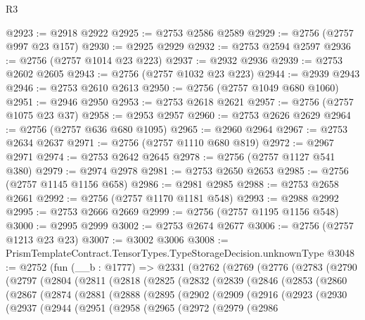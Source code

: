 \begin{lexlean}{R3}
\begin{coremodule}
@2923 := @2918 @2922
@2925 := @2753 @2586 @2589
@2929 := @2756 (@2757 @997 @23 @157)
@2930 := @2925 @2929
@2932 := @2753 @2594 @2597
@2936 := @2756 (@2757 @1014 @23 @223)
@2937 := @2932 @2936
@2939 := @2753 @2602 @2605
@2943 := @2756 (@2757 @1032 @23 @223)
@2944 := @2939 @2943
@2946 := @2753 @2610 @2613
@2950 := @2756 (@2757 @1049 @680 @1060)
@2951 := @2946 @2950
@2953 := @2753 @2618 @2621
@2957 := @2756 (@2757 @1075 @23 @37)
@2958 := @2953 @2957
@2960 := @2753 @2626 @2629
@2964 := @2756 (@2757 @636 @680 @1095)
@2965 := @2960 @2964
@2967 := @2753 @2634 @2637
@2971 := @2756 (@2757 @1110 @680 @819)
@2972 := @2967 @2971
@2974 := @2753 @2642 @2645
@2978 := @2756 (@2757 @1127 @541 @380)
@2979 := @2974 @2978
@2981 := @2753 @2650 @2653
@2985 := @2756 (@2757 @1145 @1156 @658)
@2986 := @2981 @2985
@2988 := @2753 @2658 @2661
@2992 := @2756 (@2757 @1170 @1181 @548)
@2993 := @2988 @2992
@2995 := @2753 @2666 @2669
@2999 := @2756 (@2757 @1195 @1156 @548)
@3000 := @2995 @2999
@3002 := @2753 @2674 @2677
@3006 := @2756 (@2757 @1213 @23 @23)
@3007 := @3002 @3006
@3008 := PrismTemplateContract.TensorTypes.TypeStorageDecision.unknownType
@3048 := @2752
    (fun (__b : @1777) =>
    @2331
      (@2762
        (@2769
          (@2776
            (@2783
              (@2790
                (@2797
                  (@2804
                    (@2811
                      (@2818
                        (@2825
                          (@2832
                            (@2839
                              (@2846
                                (@2853
                                  (@2860
                                    (@2867
                                      (@2874
                                        (@2881
                                          (@2888
                                            (@2895
                                              (@2902
                                                (@2909
                                                  (@2916
                                                    (@2923
                                                      (@2930
                                                        (@2937
                                                          (@2944
                                                            (@2951
                                                              (@2958
                                                                (@2965
                                                                  (@2972
                                                                    (@2979
                                                                      (@2986

\end{coremodule}
\end{lexlean}
